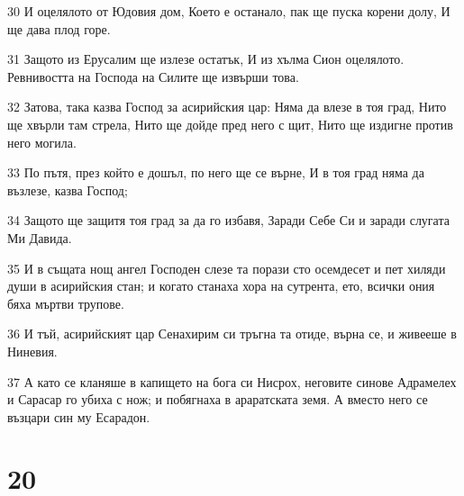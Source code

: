 \par 30 И оцелялото от Юдовия дом, Което е останало, пак ще пуска корени долу, И ще дава плод горе.
\par 31 Защото из Ерусалим ще излезе остатък, И из хълма Сион оцелялото. Ревнивостта на Господа на Силите ще извърши това.
\par 32 Затова, така казва Господ за асирийския цар: Няма да влезе в тоя град, Нито ще хвърли там стрела, Нито ще дойде пред него с щит, Нито ще издигне против него могила.
\par 33 По пътя, през който е дошъл, по него ще се върне, И в тоя град няма да възлезе, казва Господ;
\par 34 Защото ще защитя тоя град за да го избавя, Заради Себе Си и заради слугата Ми Давида.
\par 35 И в същата нощ ангел Господен слезе та порази сто осемдесет и пет хиляди души в асирийския стан; и когато станаха хора на сутрента, ето, всички ония бяха мъртви трупове.
\par 36 И тъй, асирийският цар Сенахирим си тръгна та отиде, върна се, и живееше в Ниневия.
\par 37 А като се кланяше в капището на бога си Нисрох, неговите синове Адрамелех и Сарасар го убиха с нож; и побягнаха в араратската земя. А вместо него се възцари син му Есарадон.

\chapter{20}


